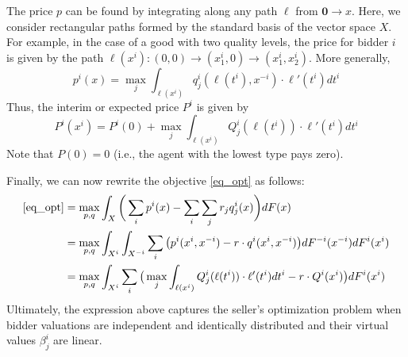 The price $p$ can be found by integrating along any path $\ell$ from $\mathbf{0} \to x$. Here, we consider rectangular paths formed by the standard basis of the vector space $X$. For example, in the case of a good with two quality levels, the price for bidder $i$ is given by the path $\ell(x^i) : (0,0) \to (x_1^i,0) \to (x_1^i,x_2^i)$. More generally,
\begin{equation}
    p^i(x) = \max_j \int_{\ell(x^i)} q_j^i(\ell(t^i), x^{-i}) \cdot \ell'(t^i) dt^i
\end{equation}
\noindent Thus, the interim or expected price $P^i$ is given by
\begin{equation}
    P^i(x^i) = P^i(0) + \max_j \int_{\ell(x^i)} Q_j^i(\ell(t^i)) \cdot \ell'(t^i) dt^i 
\end{equation}
\noindent Note that $P(0)=0$ (i.e., the agent with the lowest type pays zero).

Finally, we can now rewrite the objective \ref{eq_opt} as follows:
\begin{align}
    \ref{eq_opt} &= \max_{p,q} \int_X \bigg( \sum_i p^i(x)  - \sum_i \sum_j r_j q_j^i(x) \bigg) dF(x) \\
        &= \max_{p,q} \int_{X^i} \int_{X^{-i}} \sum_i \big( p^i(x^i, x^{-i}) - r \cdot q^i(x^i, x^{-i}) \big) dF^{-i}(x^{-i}) dF^i(x^i) \\
        &= \max_{p,q} \int_{X^i} \sum_i \big( \max_j \int_{\ell(x^i)} Q_j^i(\ell(t^i)) \cdot \ell'(t^i) dt^i  - r \cdot Q^i(x^i) \big) dF^i(x^i)
\end{align}
\noindent Ultimately, the expression above captures the seller's optimization problem when bidder valuations are independent and identically distributed and their virtual values $\beta_j^i$ are linear.




